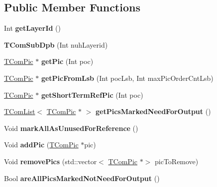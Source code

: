 \subsection*{Public Member Functions}
\begin{DoxyCompactItemize}
\item 
\mbox{\label{class_t_com_sub_dpb_ac70acec8678eb669560d1a8d147c2a15}} 
Int {\bfseries get\+Layer\+Id} ()
\end{DoxyCompactItemize}
{\bf }\par
\begin{DoxyCompactItemize}
\item 
\mbox{\label{class_t_com_sub_dpb_a9775ec2e7bcf5a13ba564a228ecd599b}} 
{\bfseries T\+Com\+Sub\+Dpb} (Int nuh\+Layerid)
\item 
\mbox{\label{class_t_com_sub_dpb_aeb9ec15434df6d54206ef75a4ca92509}} 
\hyperlink{class_t_com_pic}{T\+Com\+Pic} $\ast$ {\bfseries get\+Pic} (Int poc)
\item 
\mbox{\label{class_t_com_sub_dpb_aecbf4fbf933fe69947a63d423509c941}} 
\hyperlink{class_t_com_pic}{T\+Com\+Pic} $\ast$ {\bfseries get\+Pic\+From\+Lsb} (Int poc\+Lsb, Int max\+Pic\+Order\+Cnt\+Lsb)
\item 
\mbox{\label{class_t_com_sub_dpb_a8eb9e01240d13d7cfdcac0b9721fb63b}} 
\hyperlink{class_t_com_pic}{T\+Com\+Pic} $\ast$ {\bfseries get\+Short\+Term\+Ref\+Pic} (Int poc)
\item 
\mbox{\label{class_t_com_sub_dpb_aae0716e438771044562959b7df6115cd}} 
\hyperlink{class_t_com_list}{T\+Com\+List}$<$ \hyperlink{class_t_com_pic}{T\+Com\+Pic} $\ast$ $>$ {\bfseries get\+Pics\+Marked\+Need\+For\+Output} ()
\item 
\mbox{\label{class_t_com_sub_dpb_a3c09521ed0a57d3c3e88409c6c225e32}} 
Void {\bfseries mark\+All\+As\+Unused\+For\+Reference} ()
\item 
\mbox{\label{class_t_com_sub_dpb_a53815e5b4fdd83841d7f4a47357d4da0}} 
Void {\bfseries add\+Pic} (\hyperlink{class_t_com_pic}{T\+Com\+Pic} $\ast$pic)
\item 
\mbox{\label{class_t_com_sub_dpb_a559e2632e310639b81e9978da47ec434}} 
Void {\bfseries remove\+Pics} (std\+::vector$<$ \hyperlink{class_t_com_pic}{T\+Com\+Pic} $\ast$$>$ pic\+To\+Remove)
\item 
\mbox{\label{class_t_com_sub_dpb_a8dfdb22001d3443f61fb6c7cc5b2bc79}} 
Bool {\bfseries are\+All\+Pics\+Marked\+Not\+Need\+For\+Output} ()
\end{DoxyCompactItemize}

